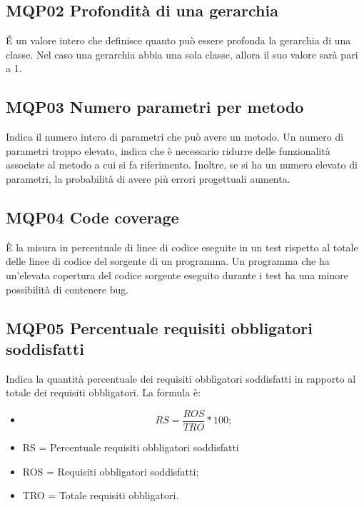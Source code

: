 \subsection{MQP02 Profondità di una gerarchia}
\'E un valore intero che definisce quanto può essere profonda la gerarchia di una classe. Nel caso una gerarchia abbia una sola classe, allora il suo valore sarà pari a 1.

\subsection{MQP03 Numero parametri per metodo}
Indica il numero intero di parametri che può avere un metodo. Un numero di parametri troppo elevato, indica che è necessario ridurre delle funzionalità associate al metodo a cui si fa riferimento. Inoltre, se si ha un numero elevato di parametri, la probabilità di avere più errori progettuali aumenta.

\subsection{MQP04 Code coverage}
È la misura in percentuale di linee di codice eseguite in un test rispetto al totale delle linee di codice del sorgente di un programma. Un programma che ha un’elevata copertura del codice sorgente eseguito durante i test ha una minore possibilità di contenere bug.

\subsection{MQP05 Percentuale requisiti obbligatori soddisfatti}
Indica la quantità percentuale dei requisiti obbligatori soddisfatti in rapporto al totale dei requisiti obbligatori.
La formula è:
\begin{itemize}
  \item[] \[RS = \frac{ROS}{TRO} * 100;\]
  \item RS = Percentuale requisiti obbligatori soddisfatti
  \item ROS = Requisiti obbligatori soddisfatti;
  \item TRO = Totale requisiti 	obbligatori.
  \end{itemize}


